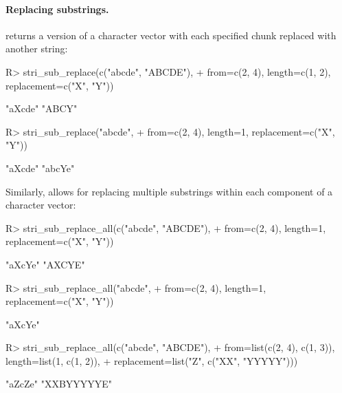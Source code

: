 \documentclass[nojss]{jss}
\begin{document}
\paragraph{Replacing substrings.}
 returns a version
of a character vector with each specified chunk replaced with another
string:

\begin{Schunk}
\begin{Sinput}
R> stri_sub_replace(c("abcde", "ABCDE"),
+      from=c(2, 4), length=c(1, 2), replacement=c("X", "Y"))
\end{Sinput}
\begin{Soutput}
[1] "aXcde" "ABCY"
\end{Soutput}
\begin{Sinput}
R> stri_sub_replace("abcde",
+      from=c(2, 4), length=1, replacement=c("X", "Y"))
\end{Sinput}
\begin{Soutput}
[1] "aXcde" "abcYe"
\end{Soutput}
\end{Schunk}

\noindent
Similarly,  allows for replacing
multiple substrings within each component of a character vector:

\begin{Schunk}
\begin{Sinput}
R> stri_sub_replace_all(c("abcde", "ABCDE"),
+      from=c(2, 4), length=1, replacement=c("X", "Y"))
\end{Sinput}
\begin{Soutput}
[1] "aXcYe" "AXCYE"
\end{Soutput}
\begin{Sinput}
R> stri_sub_replace_all("abcde",
+      from=c(2, 4), length=1, replacement=c("X", "Y"))
\end{Sinput}
\begin{Soutput}
[1] "aXcYe"
\end{Soutput}
\begin{Sinput}
R> stri_sub_replace_all(c("abcde", "ABCDE"),
+      from=list(c(2, 4), c(1, 3)), length=list(1, c(1, 2)),
+      replacement=list("Z", c("XX", "YYYYY")))
\end{Sinput}
\begin{Soutput}
[1] "aZcZe"     "XXBYYYYYE"
\end{Soutput}
\end{Schunk}
\end{document}
